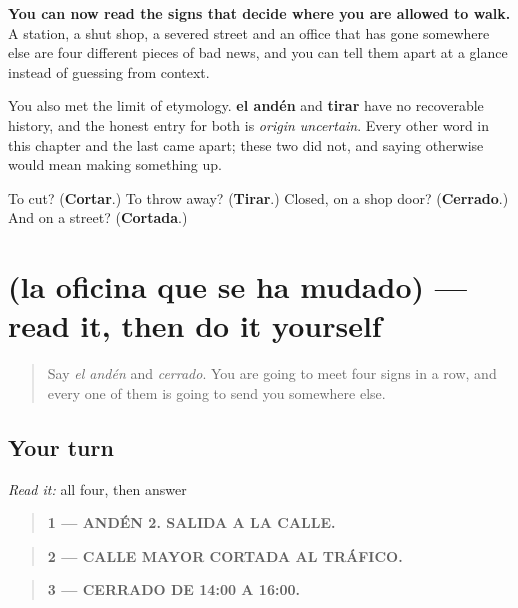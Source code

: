 \begin{grammarlens}[title={What you've built}]
\textbf{You can now read the signs that decide where you are allowed to walk.} A station, a shut shop, a severed street and an office that has gone somewhere else are four different pieces of bad news, and you can tell them apart at a glance instead of guessing from context.

You also met the limit of etymology. \textbf{el andén} and \textbf{tirar} have no recoverable history, and the honest entry for both is \emph{origin uncertain}. Every other word in this chapter and the last came apart; these two did not, and saying otherwise would mean making something up.
\end{grammarlens}

\begin{tcolorbox}[breakable,colback=teal!4,colframe=teal!35!black,title={Before you move on}]
To cut? (\textbf{Cortar}.) To throw away? (\textbf{Tirar}.) Closed, on a shop door? (\textbf{Cerrado}.) And on a street? (\textbf{Cortada}.)
\end{tcolorbox}
\section[Practice]{(la oficina que se ha mudado) — read it, then do it yourself}

\label{lesson:ES-C439-sintesis-via}



\begin{quote}
Say \emph{el andén} and \emph{cerrado}. You are going to meet four signs in a row, and every one of them is going to send you somewhere else.
\end{quote}

\subsection*{Your turn}
\emph{Read it:} all four, then answer

\begin{quote}
\textbf{1 — ANDÉN 2. SALIDA A LA CALLE.}
\end{quote}

\begin{quote}
\textbf{2 — CALLE MAYOR CORTADA AL TRÁFICO.}
\end{quote}

\begin{quote}
\textbf{3 — CERRADO DE 14:00 A 16:00.}
\end{quote}


